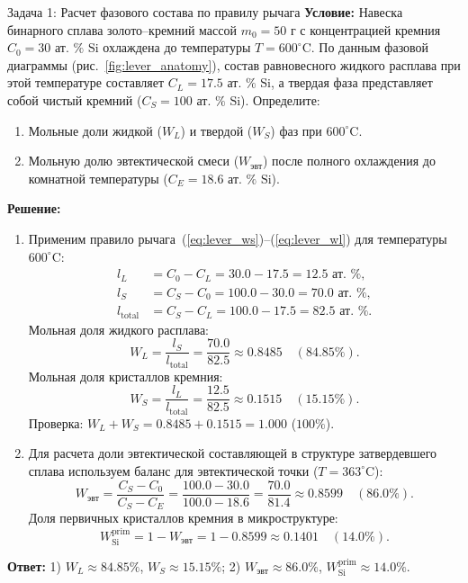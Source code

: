 \documentclass[12pt,a4paper]{article}
\begin{document}
\begin{exbox}{Задача 1: Расчет фазового состава по правилу рычага}
\textbf{Условие:} Навеска бинарного сплава золото--кремний массой $m_0 = 50\text{ г}$ с концентрацией кремния $C_0 = 30\text{ ат. }\%\text{ Si}$ охлаждена до температуры $T = 600^\circ\mathrm{C}$. По данным фазовой диаграммы (рис.~\ref{fig:lever_anatomy}), состав равновесного жидкого расплава при этой температуре составляет $C_L = 17.5\text{ ат. }\%\text{ Si}$, а твердая фаза представляет собой чистый кремний ($C_S = 100\text{ ат. }\%\text{ Si}$).
Определите:
\begin{enumerate}
    \item Мольные доли жидкой ($W_L$) и твердой ($W_S$) фаз при $600^\circ\mathrm{C}$.
    \item Мольную долю эвтектической смеси ($W_{\text{эвт}}$) после полного охлаждения до комнатной температуры ($C_E = 18.6\text{ ат. }\%\text{ Si}$).
\end{enumerate}

\tcbline
\textbf{Решение:}
\begin{enumerate}
    \item Применим правило рычага~(\ref{eq:lever_ws})--(\ref{eq:lever_wl}) для температуры $600^\circ\mathrm{C}$:
    \begin{align*}
    l_L &= C_0 - C_L = 30.0 - 17.5 = 12.5\text{ ат. }\%,\\
    l_S &= C_S - C_0 = 100.0 - 30.0 = 70.0\text{ ат. }\%,\\
    l_{\mathrm{total}} &= C_S - C_L = 100.0 - 17.5 = 82.5\text{ ат. }\%.
    \end{align*}
    Мольная доля жидкого расплава:
    \begin{equation*}
    W_L = \frac{l_S}{l_{\mathrm{total}}} = \frac{70.0}{82.5} \approx 0.8485 \quad (84.85\%).
    \end{equation*}
    Мольная доля кристаллов кремния:
    \begin{equation*}
    W_S = \frac{l_L}{l_{\mathrm{total}}} = \frac{12.5}{82.5} \approx 0.1515 \quad (15.15\%).
    \end{equation*}
    Проверка: $W_L + W_S = 0.8485 + 0.1515 = 1.000$ ($100\%$).

    \item Для расчета доли эвтектической составляющей в структуре затвердевшего сплава используем баланс для эвтектической точки ($T = 363^\circ\mathrm{C}$):
    \begin{equation*}
    W_{\text{эвт}} = \frac{C_S - C_0}{C_S - C_E} = \frac{100.0 - 30.0}{100.0 - 18.6} = \frac{70.0}{81.4} \approx 0.8599 \quad (86.0\%).
    \end{equation*}
    Доля первичных кристаллов кремния в микроструктуре:
    \begin{equation*}
    W_{\mathrm{Si}}^{\mathrm{prim}} = 1 - W_{\text{эвт}} = 1 - 0.8599 \approx 0.1401 \quad (14.0\%).
    \end{equation*}
\end{enumerate}
\textbf{Ответ:} 1) $W_L \approx 84.85\%$, $W_S \approx 15.15\%$; 2) $W_{\text{эвт}} \approx 86.0\%$, $W_{\mathrm{Si}}^{\mathrm{prim}} \approx 14.0\%$.
\end{exbox}
\end{document}

